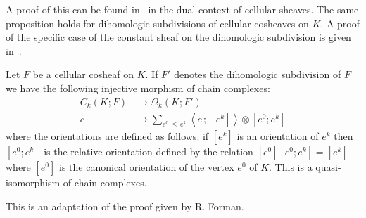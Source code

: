 \documentclass[AHL,Unicode,longabstracts,published]{cedram}
\begin{document}
A proof of this can be found in~\cite[Theorem~1.5.2 p.~31]{She_cel_des}
in the dual context of cellular sheaves. The same proposition holds for dihomologic subdivisions of cellular cosheaves on $K$. A proof of the specific case of the constant sheaf on the dihomologic subdivision is given in~\cite[Theorem~1.2 p.~12]{For_comb_nov}.

\begin{prop}
Let $F$ be a cellular cosheaf on $K$. If $F'$ denotes the dihomologic subdivision of $F$ we have the following injective morphism of chain complexes:
\begin{align*}
C_k(K;F) & \longrightarrow  \Omega_k(K;F') \\
c & \longmapsto  \sum_{e^0\,\leq\,e^k} \left\langle c\,;\,[e^k]\right\rangle\otimes \left[e^0;e^k\right]
\end{align*}
where the orientations are defined as follows: if $[e^k]$ is an orientation of $e^k$ then $[e^0;e^k]$ is the relative orientation defined by the relation $[e^0][e^0;e^k]=[e^k]$ where $[e^0]$ is the canonical orientation of the vertex $e^0$ of $K$. This is a quasi-isomorphism of chain complexes.
\end{prop}

This is an adaptation of the proof given by R. Forman.
\end{document}
